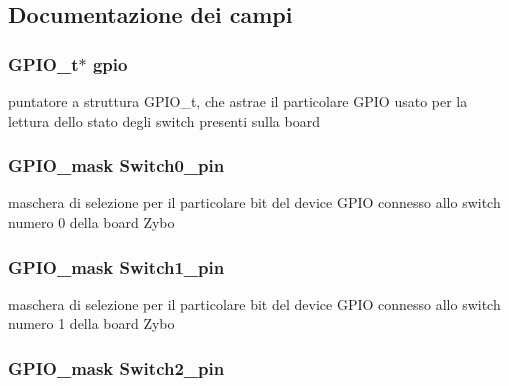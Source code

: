 \subsection{Documentazione dei campi}
\hypertarget{struct_zybo_switch__t_acb3116190992a4d8d26545c103304d27}{
\subsubsection[{gpio}]{\setlength{\rightskip}{0pt plus 5cm}G\+P\+I\+O\+\_\+t$\ast$ gpio}}\label{struct_zybo_switch__t_acb3116190992a4d8d26545c103304d27}
puntatore a struttura G\+P\+I\+O\+\_\+t, che astrae il particolare G\+P\+I\+O usato per la lettura dello stato degli switch presenti sulla board \hypertarget{struct_zybo_switch__t_a5b7f83cd96441b7d1692710c6499147c}{
\subsubsection[{Switch0\+\_\+pin}]{\setlength{\rightskip}{0pt plus 5cm}G\+P\+I\+O\+\_\+mask Switch0\+\_\+pin}}\label{struct_zybo_switch__t_a5b7f83cd96441b7d1692710c6499147c}
maschera di selezione per il particolare bit del device G\+P\+I\+O connesso allo switch numero 0 della board Zybo \hypertarget{struct_zybo_switch__t_a6a3a5739e7e8f138241cafeeb7c1a33f}{
\subsubsection[{Switch1\+\_\+pin}]{\setlength{\rightskip}{0pt plus 5cm}G\+P\+I\+O\+\_\+mask Switch1\+\_\+pin}}\label{struct_zybo_switch__t_a6a3a5739e7e8f138241cafeeb7c1a33f}
maschera di selezione per il particolare bit del device G\+P\+I\+O connesso allo switch numero 1 della board Zybo \hypertarget{struct_zybo_switch__t_a33eda4a0115ef585edd90078924ca56e}{
\subsubsection[{Switch2\+\_\+pin}]{\setlength{\rightskip}{0pt plus 5cm}G\+P\+I\+O\+\_\+mask Switch2\+\_\+pin}}\label{struct_zybo_switch__t_a33eda4a0115ef585edd90078924ca56e}

